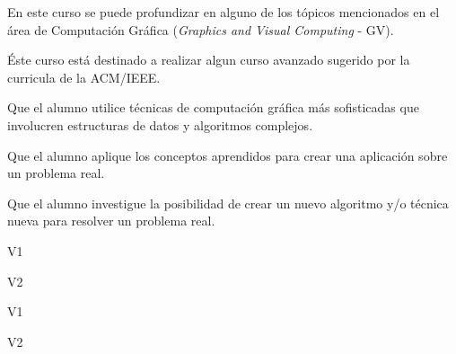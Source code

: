 \begin{syllabus}


\begin{justification}
En este curso se puede profundizar en alguno de los tópicos
mencionados en el área de Computación Gráfica (\textit{Graphics and Visual
Computing} - GV).

Éste curso está destinado a realizar algun curso avanzado sugerido por la curricula de la ACM/IEEE. \cite{Foley13,Hearn90}
\end{justification}

\begin{goals}
\item Que el alumno utilice técnicas de computación gráfica más sofisticadas que involucren estructuras de datos y algoritmos complejos.
\item Que el alumno aplique los conceptos aprendidos para crear una aplicación sobre un problema real.
\item Que el alumno investigue la posibilidad de crear un nuevo algoritmo y/o técnica nueva para resolver un problema real.
\end{goals}

\begin{outcomes}{V1}
    \item {}
    \item {}
    \item {}
    \item {}
\end{outcomes}

\begin{outcomes}{V2}
    \item {}
    \item {}
    \item {}
    \item {}
\end{outcomes}

\begin{competences}{V1}
    \item {}
    \item {}
\end{competences}

\begin{competences}{V2}
    \item {}
    \item {}
\end{competences}


\end{syllabus}
